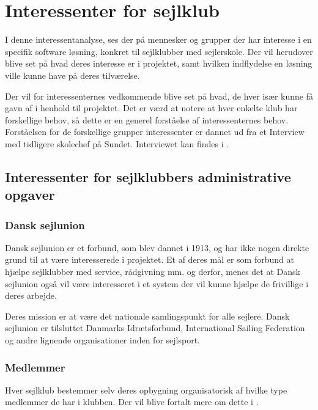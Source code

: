 \chapter{Interessenter for sejlklub}\label{chap:interessent-analyse-ved-sejlklubber}

I denne interessentanalyse, ses der på mennesker og grupper der har interesse i en specifik software løsning, konkret
til sejlklubber med sejlerskole. Der vil herudover blive set på hvad deres interesse er i projektet, samt hvilken
indflydelse en løsning ville kunne have på deres tilværelse.


Der vil for interessenternes vedkommende blive set på hvad, de hver især kunne få gavn af i henhold til projektet. 
Det er værd at notere at hver enkelte klub har forskellige behov, så dette er en generel forståelse af interessenternes
behov. Forståelsen for de forskellige grupper interessenter er dannet ud fra et Interview med tidligere skolechef på
Sundet. Interviewet kan findes i .

\section{Interessenter for sejlklubbers administrative opgaver}

\subsection{Dansk sejlunion}

Dansk sejlunion er et forbund, som blev dannet i 1913, og har ikke nogen direkte grund til at være interesserede i
projektet.
Et af deres mål er som forbund at hjælpe sejlklubber med service, rådgivning mm. og derfor, menes det at Dansk sejlunion
også vil være interesseret i et system der vil kunne hjælpe de frivillige i deres arbejde.

Deres mission er at være det nationale samlingspunkt for alle sejlere. Dansk sejlunion er tilsluttet Danmarks
Idrætsforbund, International Sailing Federation og andre lignende organisationer inden for sejlsport.
\citep{Sejlsportdk}


\subsection{Medlemmer}

Hver sejlklub bestemmer selv deres opbygning organisatorisk af hvilke type medlemmer de har i klubben. Der vil blive
fortalt mere om dette i . 

